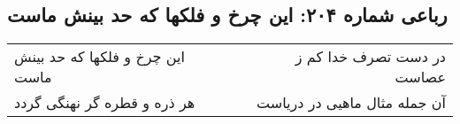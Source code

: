 \begin{center}
\section*{رباعی شماره ۲۰۴: این چرخ و فلکها که حد بینش ماست}
\label{sec:0204}
\begin{longtable}{l p{0.5cm} r}
این چرخ و فلکها که حد بینش ماست
&&
در دست تصرف خدا کم ز عصاست
\\
هر ذره و قطره گر نهنگی گردد
&&
آن جمله مثال ماهیی در دریاست
\\
\end{longtable}
\end{center}
